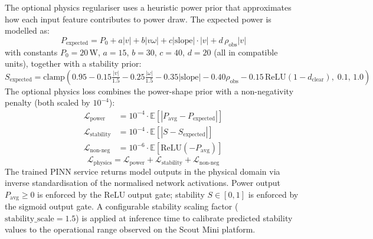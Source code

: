 \documentclass[pdflatex,sn-nature]{sn-jnl}%
\begin{document}
The optional physics regulariser uses a heuristic power prior that approximates how each input feature contributes to power draw. The expected power is modelled as:
\begin{equation}
P_{\text{expected}} = P_0 + a|v| + b|v\omega| + c|\text{slope}|\cdot|v| + d\,\rho_{\text{obs}}|v|
\label{eq:expected_power}
\end{equation}
with constants $P_0=20$\,W, $a=15$, $b=30$, $c=40$, $d=20$ (all in compatible units), together with a stability prior:
\begin{equation}
S_{\text{expected}} = \text{clamp}\!\left(0.95 - 0.15\tfrac{|v|}{1.5} - 0.25\tfrac{|\omega|}{1.5} - 0.35|\text{slope}| - 0.40\rho_{\text{obs}} - 0.15\,\text{ReLU}(1-d_{\text{clear}}),\; 0.1,\, 1.0\right)
\label{eq:stability_prior}
\end{equation}
The optional physics loss combines the power-shape prior with a non-negativity penalty (both scaled by $10^{-4}$):
\begin{align}
\mathcal{L}_{\text{power}} &= 10^{-4}\cdot\mathbb{E}\!\left[|P_{\text{avg}} - P_{\text{expected}}|\right] \label{eq:loss_power} \\
\mathcal{L}_{\text{stability}} &= 10^{-4}\cdot\mathbb{E}\!\left[|S - S_{\text{expected}}|\right] \label{eq:loss_stability} \\
\mathcal{L}_{\text{non-neg}} &= 10^{-6}\cdot\mathbb{E}\!\left[\text{ReLU}(-P_{\text{avg}})\right] \label{eq:loss_nonneg}
\end{align}
\begin{equation}
\mathcal{L}_{\text{physics}} = \mathcal{L}_{\text{power}} + \mathcal{L}_{\text{stability}} + \mathcal{L}_{\text{non-neg}}
\label{eq:loss_physics}
\end{equation}
The trained PINN service returns model outputs in the physical domain via inverse standardisation of the normalised network activations. Power output $P_{\text{avg}} \geq 0$ is enforced by the ReLU output gate; stability $S \in [0,1]$ is enforced by the sigmoid output gate. A configurable stability scaling factor ($\text{stability\_scale} = 1.5$) is applied at inference time to calibrate predicted stability values to the operational range observed on the Scout Mini platform.
\end{document}
